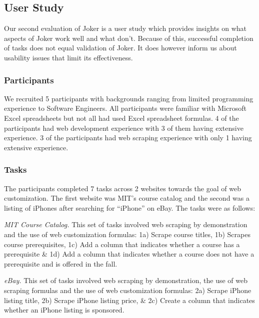 \documentclass[sigconf,10pt]{acmart}
\begin{document}
\hypertarget{user-study}{%
\subsection{User Study}\label{user-study}}

Our second evaluation of Joker is a user study which provides insights
on what aspects of Joker work well and what don't. Because of this,
successful completion of tasks does not equal validation of Joker. It
does however inform us about usability issues that limit its
effectiveness.

\hypertarget{participants}{%
\subsubsection{Participants}\label{participants}}

We recruited 5 participants with backgrounds ranging from limited
programming experience to Software Engineers. All participants were
familiar with Microsoft Excel spreadsheets but not all had used Excel
spreadsheet formulas. 4 of the participants had web development
experience with 3 of them having extensive experience. 3 of the
participants had web scraping experience with only 1 having extensive
experience.

\hypertarget{tasks}{%
\subsubsection{Tasks}\label{tasks}}

The participants completed 7 tasks across 2 websites towards the goal of
web customization. The first website was MIT's course catalog and the
second was a listing of iPhones after searching for ``iPhone'' on eBay.
The tasks were as follows:

\emph{MIT Course Catalog.} This set of tasks involved web scraping by
demonstration and the use of web customization formulas: 1a) Scrape
course titles, 1b) Scrapes course prerequisites, 1c) Add a column that
indicates whether a course has a prerequisite \& 1d) Add a column that
indicates whether a course does not have a prerequisite and is offered
in the fall.

\emph{eBay.} This set of tasks involved web scraping by demonstration,
the use of web scraping formulas and the use of web customization
formulas: 2a) Scrape iPhone listing title, 2b) Scrape iPhone listing
price, \& 2c) Create a column that indicates whether an iPhone listing
is sponsored.
\end{document}
